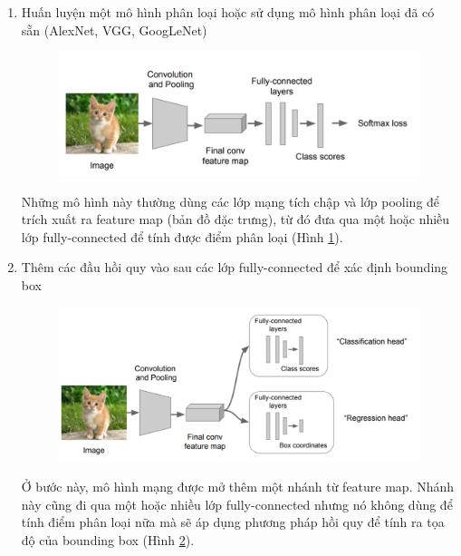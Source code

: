\begin{enumerate}
	\item Huấn luyện một mô hình phân loại hoặc sử dụng mô hình phân loại đã có sẵn (AlexNet, VGG, GoogLeNet)
	\begin{center}
    \begin{figure}[H]
    \centering
    \includegraphics[width=0.8\columnwidth]{images/chap2/localization_2.png}
    \label{fig:2.23}
    \end{figure}
	\end{center}
	Những mô hình này thường dùng các lớp mạng tích chập và lớp pooling để trích xuất ra feature map (bản đồ đặc trưng), từ đó đưa qua một hoặc nhiều lớp fully-connected để tính được điểm phân loại (Hình \ref{fig:2.23}).
	\item  Thêm các đầu hồi quy vào sau các lớp fully-connected để xác định bounding box
	\begin{center}
    \begin{figure}[H]
    \centering
    \includegraphics[width=0.8\columnwidth]{images/chap2/localization_3.png}
    \label{fig:2.24}
    \end{figure}
	\end{center}
	Ở bước này, mô hình mạng được mở thêm một nhánh từ feature map. Nhánh này cũng đi qua một hoặc nhiều lớp fully-connected nhưng nó không dùng để tính điểm phân loại nữa mà sẽ áp dụng phương pháp hồi quy để tính ra tọa độ của bounding box (Hình \ref{fig:2.24}).

\end{enumerate}
